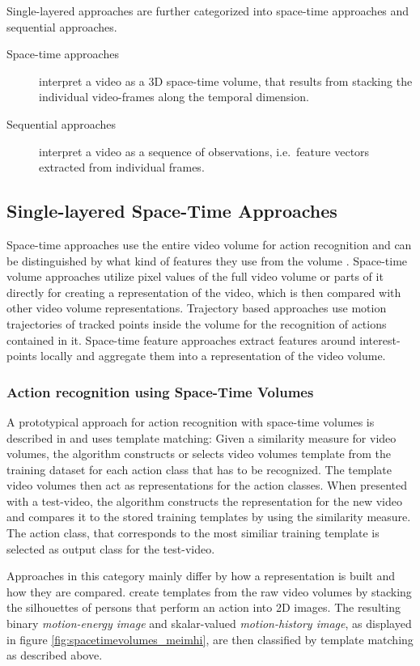 Single-layered approaches are further categorized into space-time approaches and sequential approaches.
\begin{description}
    \item[Space-time approaches] interpret a video as a 3D space-time volume, that results from stacking the individual video-frames along the temporal dimension.
    \item[Sequential approaches] interpret a video as a sequence of observations, i.e.\ feature vectors extracted from individual frames.
\end{description}


\subsection{Single-layered Space-Time Approaches}
Space-time approaches use the entire video volume for action recognition and can be distinguished by what kind of features they use from the volume \cite{aggarwal_human_2011}.
Space-time volume approaches utilize pixel values of the full video volume or parts of it directly for creating a representation of the video, which is then compared with other video volume representations.
Trajectory based approaches use motion trajectories of tracked points inside the volume for the recognition of actions contained in it.
Space-time feature approaches extract features around interest-points locally and aggregate them into a representation of the video volume.


\subsubsection{Action recognition using Space-Time Volumes}
A prototypical approach for action recognition with space-time volumes is described in \cite{aggarwal_human_2011} and uses template matching:
Given a similarity measure for video volumes, the algorithm constructs or selects video volumes template from the training dataset for each action class that has to be recognized.
The template video volumes then act as representations for the action classes.
When presented with a test-video, the algorithm constructs the representation for the new video and compares it to the stored training templates by using the similarity measure.
The action class, that corresponds to the most similiar training template is selected as output class for the test-video.

Approaches in this category mainly differ by how a representation is built and how they are compared.
\textcite{bobick_recognition_2001} create templates from the raw video volumes by stacking the silhouettes of persons that perform an action into 2D images.
The resulting binary \textit{motion-energy image} and skalar-valued \textit{motion-history image}, as displayed in figure \ref{fig:spacetimevolumes_meimhi}, are then classified by template matching as described above.

